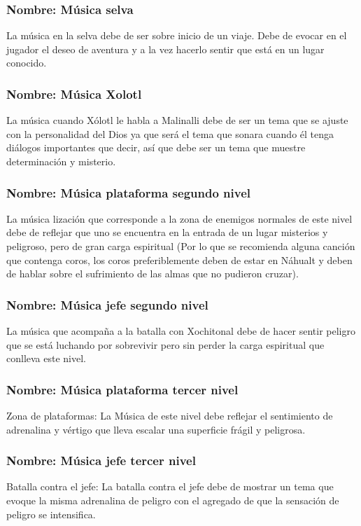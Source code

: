 \documentclass[11pt,letterpaper]{article}
\begin{document}
\subsubsection{Nombre: Música  selva}
La música en la selva debe de ser sobre inicio de un viaje. Debe de evocar en el jugador el deseo de aventura y a la vez hacerlo sentir que está en un lugar conocido.
\subsubsection{Nombre: Música  Xolotl} 
La música cuando Xólotl le habla a Malinalli debe de ser un tema que se ajuste con la personalidad del Dios ya que será el tema que sonara cuando él tenga diálogos importantes que decir, así que debe ser un tema que muestre determinación y misterio.
\subsubsection{Nombre: Música plataforma segundo nivel}
La música lización que corresponde a la zona de enemigos normales de este nivel debe de reflejar que uno se encuentra en la entrada de un lugar misterios y peligroso, pero de gran carga espiritual (Por lo que se recomienda alguna canción que contenga coros, los coros preferiblemente deben de estar en Náhualt y deben de hablar sobre el sufrimiento de las almas que no pudieron cruzar).
\subsubsection{Nombre: Música jefe segundo nivel}
La música que acompaña a la batalla con Xochitonal debe de hacer sentir peligro que se está luchando por sobrevivir pero sin perder la carga espiritual que conlleva este nivel. 
\subsubsection{Nombre: Música plataforma tercer nivel} Zona de plataformas: La Música  de este nivel debe reflejar el sentimiento de adrenalina y vértigo que lleva escalar una superficie frágil y peligrosa.
\subsubsection{Nombre: Música jefe tercer nivel} 
Batalla contra el jefe: La batalla contra el jefe debe de mostrar un tema que evoque la misma adrenalina de peligro con el agregado de que la sensación de peligro se intensifica.
\end{document}

